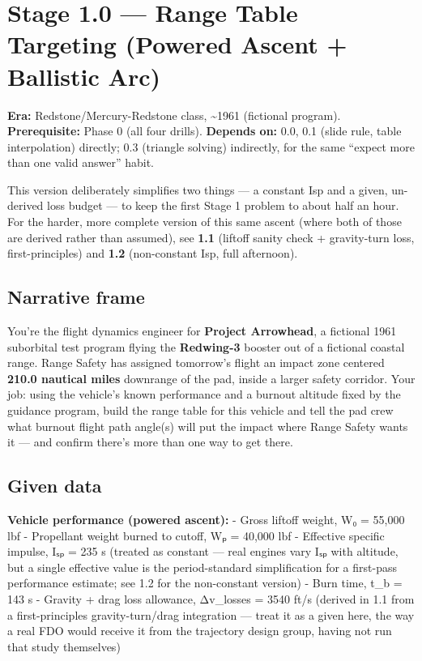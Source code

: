 \documentclass[
  10pt,
]{article}
\author{}
\date{}
\begin{document}
\hypertarget{stage-1.0-range-table-targeting-powered-ascent-ballistic-arc}{%
\section{Stage 1.0 --- Range Table Targeting (Powered Ascent + Ballistic
Arc)}\label{stage-1.0-range-table-targeting-powered-ascent-ballistic-arc}}

\textbf{Era:} Redstone/Mercury-Redstone class, \textasciitilde1961
(fictional program). \textbf{Prerequisite:} Phase 0 (all four drills).
\textbf{Depends on:} 0.0, 0.1 (slide rule, table interpolation)
directly; 0.3 (triangle solving) indirectly, for the same ``expect more
than one valid answer'' habit.

This version deliberately simplifies two things --- a constant Isp and a
given, un-derived loss budget --- to keep the first Stage 1 problem to
about half an hour. For the harder, more complete version of this same
ascent (where both of those are derived rather than assumed), see
\textbf{1.1} (liftoff sanity check + gravity-turn loss,
first-principles) and \textbf{1.2} (non-constant Isp, full afternoon).

\hypertarget{narrative-frame}{%
\subsection{Narrative frame}\label{narrative-frame}}

You're the flight dynamics engineer for \textbf{Project Arrowhead}, a
fictional 1961 suborbital test program flying the \textbf{Redwing-3}
booster out of a fictional coastal range. Range Safety has assigned
tomorrow's flight an impact zone centered \textbf{210.0 nautical miles}
downrange of the pad, inside a larger safety corridor. Your job: using
the vehicle's known performance and a burnout altitude fixed by the
guidance program, build the range table for this vehicle and tell the
pad crew what burnout flight path angle(s) will put the impact where
Range Safety wants it --- and confirm there's more than one way to get
there.

\hypertarget{given-data}{%
\subsection{Given data}\label{given-data}}

\textbf{Vehicle performance (powered ascent):} - Gross liftoff weight,
W₀ = 55,000 lbf - Propellant weight burned to cutoff, Wₚ = 40,000 lbf -
Effective specific impulse, Iₛₚ = 235 s (treated as constant --- real
engines vary Iₛₚ with altitude, but a single effective value is the
period-standard simplification for a first-pass performance estimate;
see 1.2 for the non-constant version) - Burn time, t\_b = 143 s -
Gravity + drag loss allowance, Δv\_losses = 3540 ft/s (derived in 1.1
from a first-principles gravity-turn/drag integration --- treat it as a
given here, the way a real FDO would receive it from the trajectory
design group, having not run that study themselves)
\end{document}
